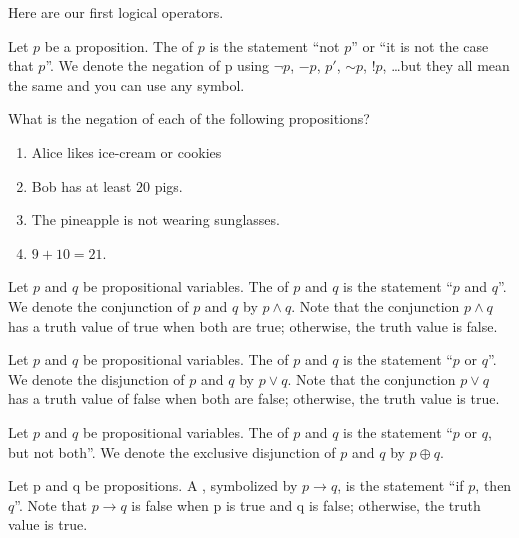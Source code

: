 \documentclass[../notes.tex]{subfiles}
\begin{document}
Here are our first logical operators.
\begin{definition}[negation]
    Let $p$ be a proposition. The  of $p$ is the statement ``not $p$'' or ``it is not the case that $p$''. We denote the negation of p using $\neg p$, $ -p$, $p'$, ${\sim}p$, $!p$, \ldots but they all mean the same and you can use any symbol. 
\end{definition}
\begin{exercise}
    What is the negation of each of the following propositions?
    \begin{enumerate}[label=(\alph*)]
        \item Alice likes ice-cream or cookies
        \item Bob has at least $20$ pigs.
        \item The pineapple is not wearing sunglasses.
        \item $9 + 10 = 21$.
    \end{enumerate}
\end{exercise}
\begin{definition}
    Let $p$ and $q$ be propositional variables. The  of $p$ and $q$ is the statement ``$p$ and $q$''. We denote the conjunction of $p$ and $q$ by $p \land q$. Note that the conjunction $ p \land q$ has a truth value of true when both are true; otherwise, the truth value is false. 
\end{definition} 
\begin{definition}
    Let $p$ and $q$ be propositional variables. The  of $p$ and $q$ is the statement ``$p$ or $q$''. We denote the disjunction of $p$ and $q$ by $p \lor q$. Note that the conjunction $ p \lor q$ has a truth value of false when both are false; otherwise, the truth value is true. 
\end{definition}
\begin{definition}
    Let $p$ and $q$ be propositional variables. The  of $p$ and $q$ is the statement ``$p$ or $q$, but not both''. We denote the exclusive disjunction of $p$ and $q$ by $p \oplus q$. 
\end{definition}
\begin{definition}
    Let p and q be propositions. A , symbolized by $p \rightarrow q$, is the statement ``if $p$, then $q$''. Note that $ p \rightarrow q$ is false when p is true and q is false; otherwise, the truth value is true. 
\end{definition}
\end{document}
